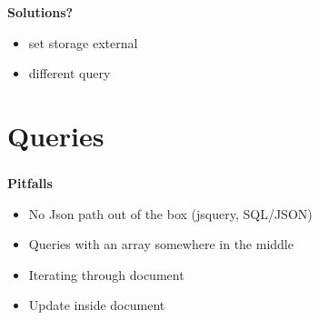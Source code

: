 \documentclass[usenames,dvipsnames, 18pt, compress, aspectratio=169]{beamer}
\begin{document}

\begin{frame}
    \frametitle{}
    \textbf{Solutions?}
    \begin{center}
        \begin{itemize}[label={\MVRightarrow}]
            \item set storage external
            \item different query
        \end{itemize}
    \end{center}
\end{frame}


\fontsize{13pt}{14}\selectfont
\section{Queries}
\fontsize{17pt}{18}\selectfont

\begin{frame}
    \frametitle{}
    \textbf{Pitfalls}
    \begin{center}
        \begin{itemize}[label={\MVRightarrow}]
            \item No Json path out of the box (jsquery, SQL/JSON)
            \item Queries with an array somewhere in the middle
            \item Iterating through document
            \item Update inside document
        \end{itemize}
    \end{center}
\end{frame}

\fontsize{17pt}{19}\selectfont
{}
\end{document}
